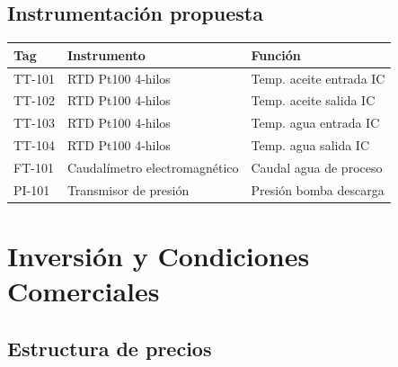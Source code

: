 \documentclass[11pt,a4paper]{article}
\begin{document}
\subsection{Instrumentación propuesta}
\begin{table}[H]
\centering
\begin{tabular}{@{}lll@{}}
\toprule
\textbf{Tag} & \textbf{Instrumento} & \textbf{Función} \\
\midrule
TT-101 & RTD Pt100 4-hilos & Temp. aceite entrada IC \\
TT-102 & RTD Pt100 4-hilos & Temp. aceite salida IC \\
TT-103 & RTD Pt100 4-hilos & Temp. agua entrada IC \\
TT-104 & RTD Pt100 4-hilos & Temp. agua salida IC \\
FT-101 & Caudalímetro electromagnético & Caudal agua de proceso \\
PI-101 & Transmisor de presión & Presión bomba descarga \\
\bottomrule
\end{tabular}
\end{table}

\newpage

\section{Inversión y Condiciones Comerciales}

\subsection{Estructura de precios}
\end{document}
